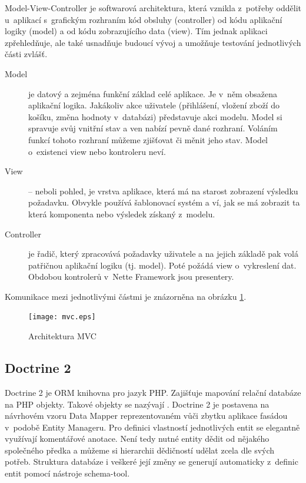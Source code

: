 \documentclass[thesis=B,czech]{FITthesis}[2012/06/26]
\begin{document}
	Model-View-Controller je softwarová architektura, která vznikla z~potřeby oddělit u~aplikací s~grafickým rozhraním kód obsluhy (controller) od kódu aplikační logiky (model) a od kódu zobrazujícího data (view). Tím jednak aplikaci zpřehledňuje, ale také usnadňuje budoucí vývoj a umožňuje testování jednotlivých části zvlášť.
	
	\begin{description}
		\item[Model] je datový a zejména funkční základ celé aplikace. Je v~něm obsažena aplikační logika. Jakákoliv akce uživatele (přihlášení, vložení zboží do košíku, změna hodnoty v~databázi) představuje akci modelu. Model si spravuje svůj vnitřní stav a ven nabízí pevně dané rozhraní. Voláním funkcí tohoto rozhraní můžeme zjišťovat či měnit jeho stav. Model o~existenci view nebo kontroleru neví.
		\item[View]-- neboli pohled, je vrstva aplikace, která má na starost zobrazení výsledku požadavku. Obvykle používá šablonovací systém a ví, jak se má zobrazit ta která komponenta nebo výsledek získaný z~modelu.
		\item[Controller]je řadič, který zpracovává požadavky uživatele a na jejich základě pak volá patřičnou aplikační logiku (tj. model). Poté požádá view o~vykreslení dat. Obdobou kontrolerů v~Nette Framework jsou presentery.\cite{nette_mvc}
	\end{description}

	Komunikace mezi jednotlivými částmi je znázorněna na obrázku \ref{mvc_arch}.

	\begin{figure}
		\texttt{[image: mvc.eps]}
		\caption{Architektura MVC}\label{mvc_arch}
	\end{figure}
	
\subsection{Doctrine 2}
	Doctrine 2 je ORM knihovna pro jazyk PHP. Zajišťuje mapování relační databáze na PHP objekty. Takové objekty se nazývají . Doctrine 2 je postavena na návrhovém vzoru Data Mapper reprezentovaném vůči zbytku aplikace fasádou v~podobě Entity Manageru. Pro definici vlastností jednotlivých entit se elegantně využívají komentářové anotace. Není tedy nutné entity dědit od nějakého společného předka a můžeme si hierarchii dědičností udělat zcela dle svých potřeb. Struktura databáze i veškeré její změny se generují automaticky z~definic entit pomocí nástroje schema-tool. \cite{doctrine2} 
	
\end{document}
